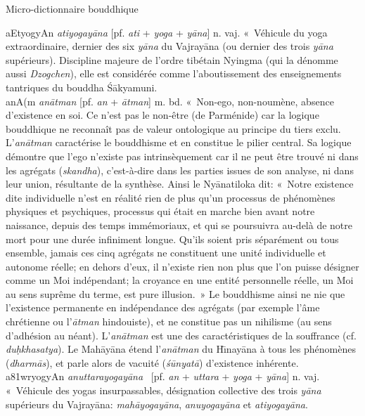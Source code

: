 \documentclass[a4paper,11pt,twocolumn]{article}
\begin{document}
\begin{center} {\Large Micro-dictionnaire bouddhique} \end{center}
\bigskip

{\dn aEtyogyAn} {\em atiyogay\={a}na} [pf. {\em ati} + {\em yoga} +
{\em y\={a}na}] n. vaj. «~Véhicule du yoga extraordinaire\fg,
dernier des six {\em y\={a}na} du Vajray\={a}na (ou dernier des trois
{\em y\={a}na} supérieurs). Discipline majeure de l'ordre tibétain
Nyingma (qui la dénomme aussi {\em Dzogchen}), elle est considérée
comme l'aboutissement des enseignements tantriques du bouddha
\'{S}\={a}kyamuni. \\

{\dn anA(m} {\em an\={a}tman} [pf. {\em an} + {\em \={a}tman}] m. bd.
«~Non-ego, non-noumène, absence d'existence en soi\fg. Ce n'est pas le
non-être (de Parménide) car la logique bouddhique ne reconnaît pas de
valeur ontologique au principe du tiers exclu. L'{\em an\={a}tman}
caractérise le bouddhisme et en constitue le pilier central. Sa logique
démontre que l'ego n'existe pas intrinsèquement car il ne
peut être trouvé ni dans les agrégats ({\em skandha}), c'est-à-dire
dans les parties issues de son analyse, ni dans leur union, résultante
de la synthèse. Ainsi le Ny\={a}natiloka dit: «~Notre existence
dite individuelle n'est en réalité rien de plus qu'un processus de
phénomènes physiques et psychiques, processus qui était en marche bien
avant notre naissance, depuis des temps immémoriaux, et qui se
poursuivra au-delà de notre mort pour une durée infiniment
longue. Qu'ils soient pris séparément ou tous ensemble, jamais ces
cinq agrégats ne constituent une unité individuelle et autonome
réelle; en dehors d'eux, il n'existe rien non plus que l'on puisse
désigner comme un Moi indépendant; la croyance en une entité
personnelle réelle, un Moi au sens suprême du terme, est pure
illusion.~» Le bouddhisme ainsi ne nie que l'existence
permanente en indépendance des agrégats (par exemple l'âme chrétienne
ou  l'{\em \={a}tman} hindouiste), et ne constitue pas un
nihilisme (au sens d'adhésion au néant). L'{\em an\={a}tman} est une
des caractéristiques de la souffrance (cf. {\em du\d{h}khasatya}). Le
Mah\={a}y\={a}na étend l'{\em an\={a}tman} du H\={\i}nay\={a}na à tous
les phénomènes ({\em dharm\={a}s}), et parle alors de vacuité
({\em \'{s}\={u}nyat\={a}}) d'existence inhérente. \\

{\dn a\381wryogyAn} {\em anuttarayogay\={a}na} \ [pf. {\em an}
+ {\em uttara}  + {\em yoga} + {\em y\={a}na}] n. vaj. «~Véhicule
des yogas insurpassables\fg, désignation collective des trois
{\em y\={a}na} supérieurs du Vajray\={a}na:
{\em mah\={a}yogay\={a}na}, {\em anuyogay\={a}na} et
{\em atiyogay\={a}na}. \\
\end{document}
